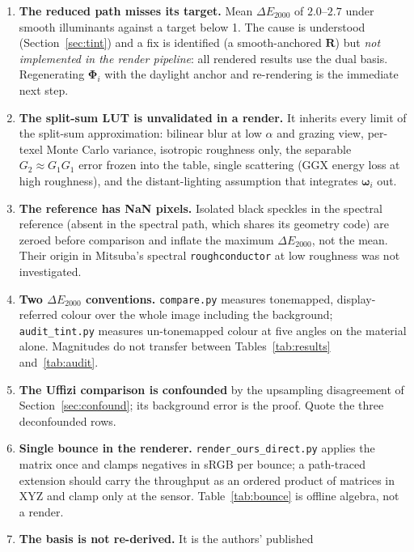 \documentclass[11pt,a4paper]{article}
\newcommand{\mR}{\mathbf{R}}
\newcommand{\mPhi}{\boldsymbol{\Phi}}
\newcommand{\wi}{\boldsymbol{\omega}_i}
\newcommand{\dE}{\Delta E_{2000}}
\newcommand{\file}[1]{\texttt{#1}}
\newcommand{\code}[1]{\texttt{#1}}
\begin{document}
\begin{enumerate}
  \item \textbf{The reduced path misses its target.}  Mean $\dE$ of
        $2.0$--$2.7$ under smooth illuminants against a target below 1.  The
        cause is understood (Section~\ref{sec:tint}) and a fix is identified
        (a smooth-anchored $\mR$) but \emph{not implemented in the render
        pipeline}: all rendered results use the dual basis.  Regenerating
        $\mPhi_i$ with the daylight anchor and re-rendering is the immediate
        next step.
  \item \textbf{The split-sum LUT is unvalidated in a render.}  It inherits
        every limit of the split-sum approximation: bilinear blur at low
        $\alpha$ and grazing view, per-texel Monte Carlo variance, isotropic
        roughness only, the separable $G_2\approx G_1G_1$ error frozen into
        the table, single scattering (GGX energy loss at high roughness), and
        the distant-lighting assumption that integrates $\wi$ out.
  \item \textbf{The reference has NaN pixels.}  Isolated black speckles in the
        spectral reference (absent in the spectral path, which shares its
        geometry code) are zeroed before comparison and inflate the maximum
        $\dE$, not the mean.  Their origin in Mitsuba's spectral
        \code{roughconductor} at low roughness was not investigated.
  \item \textbf{Two $\dE$ conventions.}  \file{compare.py} measures
        tonemapped, display-referred colour over the whole image including
        the background; \file{audit\_tint.py} measures un-tonemapped colour
        at five angles on the material alone.  Magnitudes do not transfer
        between Tables~\ref{tab:results} and~\ref{tab:audit}.
  \item \textbf{The Uffizi comparison is confounded} by the upsampling
        disagreement of Section~\ref{sec:confound}; its background error is
        the proof.  Quote the three deconfounded rows.
  \item \textbf{Single bounce in the renderer.}  \file{render\_ours\_direct.py}
        applies the matrix once and clamps negatives in sRGB per bounce; a
        path-traced extension should carry the throughput as an ordered
        product of matrices in XYZ and clamp only at the sensor.
        Table~\ref{tab:bounce} is offline algebra, not a render.
  \item \textbf{The basis is not re-derived.}  It is the authors' published

\end{enumerate}
\end{document}

